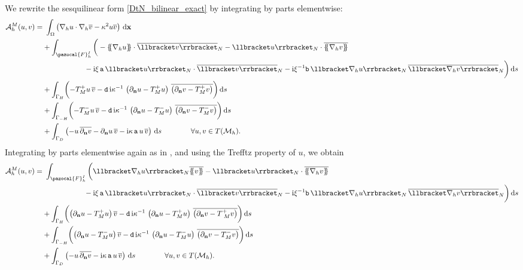 \documentclass[a4paper,10pt]{article}
\newcommand{\dlgraffa}{\{ \hspace{-0.1cm} \{}
\newcommand{\drgraffa}{\} \hspace{-0.1cm} \}}
\newcommand{\bx}{{\mathbf x}}
\newcommand{\bn}{{\mathbf n}}
\newcommand{\ri}{{\mathrm i}}
\newcommand{\rd}{{\,\mathrm d}}
\newcommand{\Mh}{{\mathcal M_h}}
\newcommand{\cA}{{\mathcal A}}
\newcommand{\pa}{{\mathtt{a}}}
\newcommand{\pb}{{\mathtt{b}}}
\newcommand{\pd}{{\mathtt{d}}}
\newcommand{\cv}{{\overline{v}}}
\newcommand{\GD}{{\Gamma_D}}
\newcommand{\GH}{{\Gamma_H}}
\newcommand{\GmH}{{\Gamma_{-H}}}
\newcommand{\FhI}{\pazocal{F}_h^I}
\begin{document}
We rewrite the sesquilinear form \eqref{DtN_bilinear_exact} by integrating by parts elementwise:
\begin{align} \label{eqn:bilinear_exact_new}
\cA^{ M}_h(u, v) =&\ \int_\Omega \left( \nabla_h u \cdot \nabla_h \cv -\kappa^2 u \cv \right) \rd\bx  \\ \nonumber
&+ \int_{\FhI} \bigg( - \dlgraffa \nabla_h u \drgraffa \cdot \overline{\llbracket v \rrbracket}_N - \llbracket u \rrbracket_N \cdot \overline{\dlgraffa \nabla_h v \drgraffa} \\ 
\nonumber 
&\hspace{20mm}
-\ri\xi \,\pa \, \llbracket u \rrbracket_N \cdot \overline{\llbracket v \rrbracket}_N 
-\ri\xi^{-1}\pb \, \llbracket \nabla_h u \rrbracket_N \, \overline{\llbracket \nabla_h v \rrbracket}_N  \bigg) \rd s \\
\nonumber
& + \int_\GH \biggl( - T_M^+u \, \overline{v} -\pd \, \ri\kappa^{-1} \, \left(\partial_\bn u -T^+_{ M} u\right) \, \overline{\left(\partial_\bn v -T_{ M}^+ v\right)} \biggl) \rd s \\
\nonumber
& + \int_\GmH \biggl( - T_M^-u \, \overline{v} -\pd \, \ri\kappa^{-1} \, \left(\partial_\bn u -T_{ M}^- u\right) \, \overline{\left(\partial_\bn v -T^-_{ M} v\right)} \biggl) \rd s \\
& + \int_\GD \left(- u \, \overline{\partial_\bn v}  -\partial_\bn u \, \cv -\ri\kappa \,\pa \, u\, \cv \right) \rd s
\qquad\qquad{\forall u,v\in T(\Mh)}
. \nonumber
\end{align}
Integrating by parts elementwise again as in \cite[eq.~(39)]{Kapita2018}, and using the Trefftz property of $u$, we obtain
\begin{align} \label{eqn:bilinear_magic}
\cA^{ M}_h(u, v) =&\ \int_{\FhI} \bigg( \llbracket \nabla_h u \rrbracket_N \overline{\dlgraffa v \drgraffa} - \llbracket u \rrbracket_N \cdot \overline{\dlgraffa \nabla_h v \drgraffa} \\ 
\nonumber 
&\hspace{20mm}
-\ri\xi \,\pa \, \llbracket u \rrbracket_N \cdot \overline{\llbracket v \rrbracket}_N 
-\ri\xi^{-1}\pb \, \llbracket \nabla_h u \rrbracket_N \, \overline{\llbracket \nabla_h v \rrbracket}_N  \bigg) \rd s \\
\nonumber
& + \int_\GH \biggl( \left(\partial_\bn u -T^+_{ M} u\right) \overline{v} -\pd \, \ri\kappa^{-1} \, \left(\partial_\bn u -T^+_{ M} u\right) \, \overline{\left(\partial_\bn v -T_{\ M}^+ v\right)} \biggl) \rd s \\
\nonumber
& + \int_\GmH \biggl( \left(\partial_\bn u -T_{ M}^- u\right) \overline{v} -\pd \, \ri\kappa^{-1} \, \left(\partial_\bn u -T_{ M}^- u\right) \, \overline{\left(\partial_\bn v -T^-_{ M} v\right)} \biggl) \rd s \\
& + \int_\GD \left(- u \, \overline{\partial_\bn v} -\ri\kappa \,\pa \, u\, \cv \right) \rd s
\qquad\qquad{\forall u,v\in T(\Mh)}
. \nonumber
\end{align}
\end{document}
